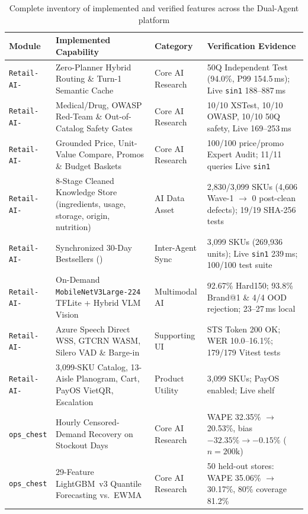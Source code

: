\begin{table}[H]
\centering
\caption{Complete inventory of implemented and verified features across the Dual-Agent platform}
\label{tab:feature_completeness}
\scriptsize
\setlength{\tabcolsep}{3.5pt}
\begin{tabularx}{\textwidth}{L{2.2cm} L{3.6cm} L{2.3cm} Y}
\toprule
\textbf{Module} & \textbf{Implemented Capability} & \textbf{Category} & \textbf{Verification Evidence} \\
\midrule
\texttt{Retail-AI-} & Zero-Planner Hybrid Routing \& Turn-1 Semantic Cache & Core AI Research & 50Q Independent Test (94.0\%, P99 154.5\,ms); Live \texttt{sin1} 188--887\,ms \\
\texttt{Retail-AI-} & Medical/Drug, OWASP Red-Team \& Out-of-Catalog Safety Gates & Core AI Research & 10/10 XSTest, 10/10 OWASP, 10/10 50Q safety, Live 169--253\,ms \\
\texttt{Retail-AI-} & Grounded Price, Unit-Value Compare, Promos \& Budget Baskets & Core AI Research & 100/100 price/promo Expert Audit; 11/11 queries Live \texttt{sin1} \\
\texttt{Retail-AI-} & 8-Stage Cleaned Knowledge Store (ingredients, usage, storage, origin, nutrition) & AI Data Asset & 2,830/3,099 SKUs (4,606 Wave-1 $\to$ 0 post-clean defects); 19/19 SHA-256 tests \\
\texttt{Retail-AI-} & Synchronized 30-Day Bestsellers () & Inter-Agent Sync & 3,099 SKUs (269,936 units); Live \texttt{sin1} 239\,ms; 100/100 test suite \\
\texttt{Retail-AI-} & On-Demand \texttt{MobileNetV3Large-224} TFLite + Hybrid VLM Vision & Multimodal AI & 92.67\% Hard150; 93.8\% Brand@1 \& 4/4 OOD rejection; 23--27\,ms local \\
\texttt{Retail-AI-} & Azure Speech Direct WSS, GTCRN WASM, Silero VAD \& Barge-in & Supporting UI & STS Token 200 OK; WER 10.0--16.1\%; 179/179 Vitest tests \\
\texttt{Retail-AI-} & 3,099-SKU Catalog, 13-Aisle Planogram, Cart, PayOS VietQR, Escalation & Product Utility &  3,099 SKUs; PayOS enabled; Live shelf  \\
\midrule
\texttt{ops\_chest} & Hourly Censored-Demand Recovery on Stockout Days & Core AI Research & WAPE 32.35\% $\to$ 20.53\%, bias $-32.35\% \to -0.15\%$ ($n=200\text{k}$) \\
\texttt{ops\_chest} & 29-Feature LightGBM~v3 Quantile Forecasting vs.\ EWMA & Core AI Research & 50 held-out stores: WAPE 35.06\% $\to$ 30.17\%, 80\% coverage 81.2\% \\

\end{tabularx}
\end{table}
